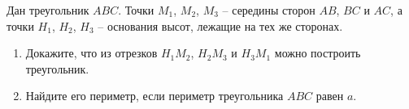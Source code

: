 \begin{ex}
	\begin{condition}
		Дан треугольник \( ABC \). Точки \( M_1 \), \( M_2 \), \( M_3 \) – середины сторон \( AB \), \( BC  \) и \( AC \), а точки \( H_1 \), \( H_2 \), \( H_3 \) – основания высот, лежащие на тех же сторонах.
		\begin{enumerate}
			\item Докажите, что из отрезков \( H_1M_2 \), \( H_2M_3  \) и \( H_3M_1  \) можно построить треугольник.
			\item Найдите его периметр, если периметр треугольника \( ABC  \) равен \( a \).
		\end{enumerate}
	\end{condition}
\end{ex}